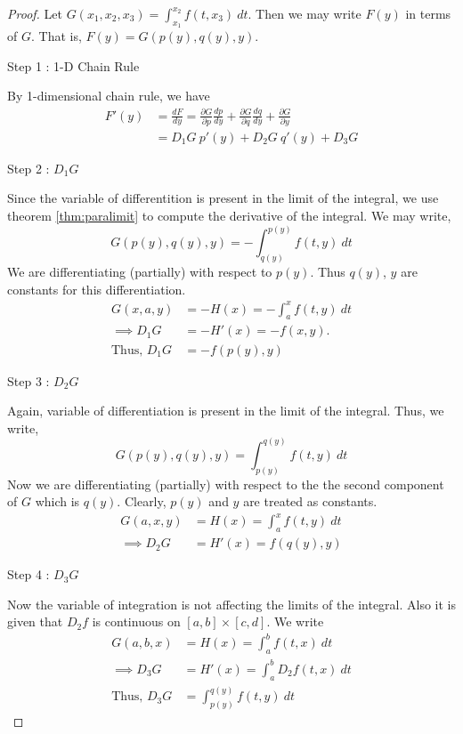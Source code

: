 \begin{proof}
Let $G(x_1,x_2,x_3) = \int_{x_1}^{x_2} f(t,x_3)\ dt$.
Then we may write $F(y)$ in terms of $G$.
That is, $F(y) = G(p(y),q(y),y)$.\\
\begin{commentary}Step 1 : 1-D Chain Rule \end{commentary}

By 1-dimensional chain rule, we have 
\begin{align*}
	F'(y) & = \frac{dF}{dy} = \frac{\partial G}{\partial p} \frac{dp}{dy} + \frac{\partial G}{\partial q} \frac{dq}{dy} + \frac{\partial G}{\partial y} \\
	& = D_1 G\ p'(y) + D_2 G\ q'(y) + D_3 G
\end{align*}
\begin{commentary}Step 2 : $D_1 G$ \end{commentary}

	Since the variable of differentition is present in the limit of the integral, we use theorem \ref{thm:paralimit} to compute the derivative of the integral.
	We may write,
	\begin{equation}
		G(p(y),q(y),y)  = -\int_{q(y)}^{p(y)} f(t,y)\ dt
	\end{equation}
	We are differentiating (partially) with respect to $p(y)$.
	Thus $q(y)$, $y$ are constants for this differentiation.
	\begin{align*}
		G(x,a,y) & = -H(x) = -\int_a^x f(t,y)\ dt\\
		\implies D_1 G & = -H'(x)= -f(x,y). \\
		\text{Thus, } D_1 G & = -f(p(y),y)
	\end{align*}
\begin{commentary}Step 3 : $D_2 G$ \end{commentary}

	Again, variable of differentiation is present in the limit of the integral.
	Thus, we write,
	\begin{equation}
		G(p(y),q(y),y) = \int_{p(y)}^{q(y)} f(t,y)\ dt
	\end{equation}
	Now we are differentiating (partially) with respect to the the second component of $G$ which is $q(y)$.
	Clearly, $p(y)$ and $y$ are treated as constants.
	\begin{align*}
		G(a,x,y) & = H(x) = \int_a^x f(t,y)\ dt \\
		\implies D_2 G & = H'(x) = f(q(y),y)
	\end{align*}
\begin{commentary}Step 4 : $D_3 G$ \end{commentary}

	Now the variable of integration is not affecting the limits of the integral.
	Also it is given that $D_2 f$ is continuous on $[a,b] \times [c,d]$.
	We write
	\begin{align*}
		G(a,b,x) & = H(x) = \int_a^b f(t,x)\ dt \\
		\implies D_3 G & = H'(x) = \int_a^b D_2 f(t,x)\ dt \\
		\text{Thus, } D_3 G & = \int_{p(y)}^{q(y)} f(t,y)\ dt
	\end{align*}
\end{proof}

